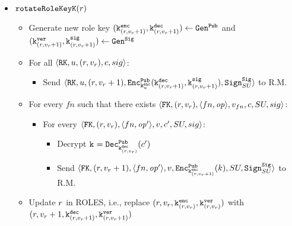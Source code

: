 {\begin{itemize}
        \item \( \rotateRoleKeyF \)
        \begin{itemize}
            \item Generate new role key \( (\keyencr{\rolev+1}, \keydecr{\rolev + 1}) \leftarrow \genpub \) and \( \keysigpairr{\rolev+1} \leftarrow \gensig \)
            \item For all \( \rt{u}{(\role, \rolev)}{c}{sig} \):
            \begin{itemize}
                \item Send \( \rt{u}{(\role, \rolev+1)}{\encpub{\keyenc{u}}{\keydecr{\rolev+1}, \keysigr{\rolev+1}}}{\sig{SU}} \) to R.M.
            \end{itemize}

            \item For every \( fn \) such that there exists \( \pt{(\role, \rolev)}{\twoang{fn}{\operation}}{\filev}{c}{SU}{sig} \):
            \begin{itemize}
                \item For every \( \pt{(\role, \rolev)}{\twoang{fn}{\operation'}}{v}{c'}{SU}{sig} \):
                \begin{itemize}
                    \item Decrypt \( \key{}{} = \decpub{\keydecr{\rolev}}{c'} \)
                    \item Send \( \pt{(\role, \rolev+1)}{\twoang{fn}{\operation'}}{v}{\encpub{\keyencr{\rolev+1}}{k}}{SU}{\sig{SU}} \) to R.M.

                \end{itemize}
            \end{itemize}


            \item Update \( \role \) in ROLES, i.e., replace \( (\role, \rolev, \keyencr{\rolev}, \keyverr{\rolev}) \) with \( (\role, \rolev + 1, \keydecr{\rolev + 1}, \keyverr{\rolev + 1}) \)
        \end{itemize}


\end{itemize}}
